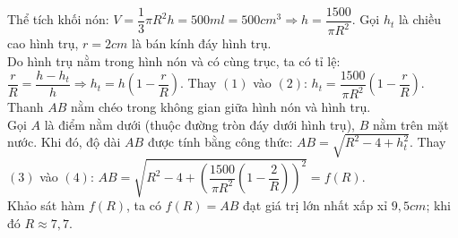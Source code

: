 \begin{ex}
{\begin{center}
    \end{center}
Thể tích khối nón: $V=\dfrac{1}{3}\pi R^2h=500ml=500cm^3 \Rightarrow h=\dfrac{1500}{\pi R^2}$. 
Gọi $h_t$ là chiều cao hình trụ, $r=2cm$ là bán kính đáy hình trụ.\\
Do hình trụ nằm trong hình nón và có cùng trục, ta có tỉ lệ: $\dfrac{r}{R}=\dfrac{h-h_t}{h}\Rightarrow h_t=h\left(1-\dfrac{r}{R}\right)$. 
Thay $(1)$ vào $(2)$: $h_t=\dfrac{1500}{\pi R^2}\left(1-\dfrac{r}{R}\right)$. 
Thanh $AB$ nằm chéo trong không gian giữa hình nón và hình trụ.\\
Gọi $A$ là điểm nằm dưới (thuộc đường tròn đáy dưới hình trụ), $B$ nằm trên mặt nước. Khi đó, độ dài $AB$ được tính bằng công thức: $AB=\sqrt{R^2-4+h_t^2}$. 
Thay $(3)$ vào $(4)$: $AB=\sqrt{R^2-4+\left(\dfrac{1500}{\pi R^2}\left(1-\dfrac{2}{R}\right)\right)^2}=f(R)$.\\
Khảo sát hàm $f(R)$, ta có $f(R)=AB$ đạt giá trị lớn nhất xấp xỉ $9{,}5cm$; khi đó $R\approx 7{,}7$.
}
\end{ex}

